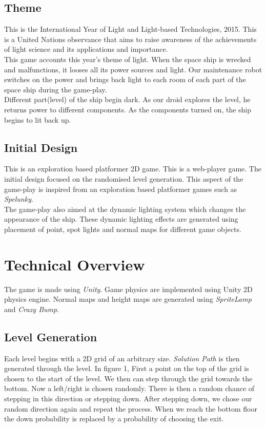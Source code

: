\documentclass[11pt]{article}
\begin{document}
\subsection{Theme}
This is the International Year of Light and Light-based Technologies, 2015. This is a United Nations observance that aims to raise awareness of the achievements of light science and its applications and importance.\\

This game accounts this year's theme of light. When the space ship is wrecked and malfunctions, it looses all its power sources and light. Our maintenance robot switches on the power and brings back light to each room of each part of the space ship during the game-play.\\

Different part(level) of the ship begin dark. As our droid explores the level, he returns power to different components. As the components turned on, the ship begins to lit back up. 
\subsection{Initial Design}
This is an exploration based platformer 2D game. This is a web-player game. The initial design focused on the randomised level generation. This aspect of the game-play is inspired from an exploration based platformer games such as \textit{Spelunky}.\\

The game-play also aimed at the dynamic lighting system which changes the appearance of the ship. These dynamic lighting effects are generated  using placement of point, spot lights and normal maps for different game objects.
\section{Technical Overview}
The game is made using \textit{Unity}. Game physics are implemented using Unity 2D physics engine. Normal maps and height maps are generated using \textit{SpriteLamp} and \textit{Crazy Bump}.
\subsection{Level Generation}
Each level begins with a 2D grid of an arbitrary size. \textit{Solution Path} is then generated through the level. In figure 1, First a point on the top of the grid is chosen to the start of the level. We then can step through the grid towards the bottom. Now a left/right is chosen randomly. There is then a random chance of stepping in this direction or stepping down. After stepping down, we chose our random direction again and repeat the process. When we reach the bottom floor the down probability is replaced by a probability of choosing the exit.\\
\end{document}
